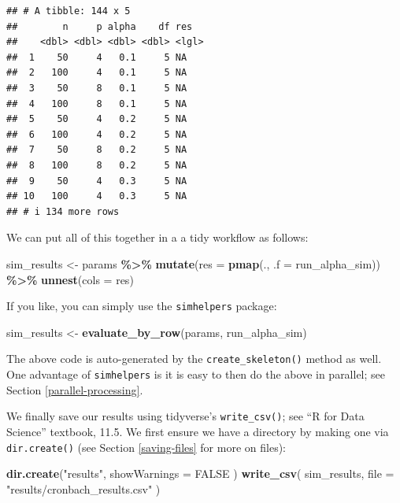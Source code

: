\documentclass[
]{book}
\newenvironment{Shaded}{\begin{snugshade}}{\end{snugshade}}
\newcommand{\AttributeTok}[1]{\textcolor[rgb]{0.13,0.29,0.53}{#1}}
\newcommand{\ConstantTok}[1]{\textcolor[rgb]{0.56,0.35,0.01}{#1}}
\newcommand{\FunctionTok}[1]{\textcolor[rgb]{0.13,0.29,0.53}{\textbf{#1}}}
\newcommand{\NormalTok}[1]{#1}
\newcommand{\OtherTok}[1]{\textcolor[rgb]{0.56,0.35,0.01}{#1}}
\newcommand{\SpecialCharTok}[1]{\textcolor[rgb]{0.81,0.36,0.00}{\textbf{#1}}}
\newcommand{\StringTok}[1]{\textcolor[rgb]{0.31,0.60,0.02}{#1}}
\begin{document}
\begin{verbatim}
## # A tibble: 144 x 5
##        n     p alpha    df res  
##    <dbl> <dbl> <dbl> <dbl> <lgl>
##  1    50     4   0.1     5 NA   
##  2   100     4   0.1     5 NA   
##  3    50     8   0.1     5 NA   
##  4   100     8   0.1     5 NA   
##  5    50     4   0.2     5 NA   
##  6   100     4   0.2     5 NA   
##  7    50     8   0.2     5 NA   
##  8   100     8   0.2     5 NA   
##  9    50     4   0.3     5 NA   
## 10   100     4   0.3     5 NA   
## # i 134 more rows
\end{verbatim}

We can put all of this together in a a tidy workflow as follows:

\begin{Shaded}
\begin{Highlighting}[]
\NormalTok{sim\_results }\OtherTok{\textless{}{-}} 
\NormalTok{  params }\SpecialCharTok{\%\textgreater{}\%}
  \FunctionTok{mutate}\NormalTok{(}\AttributeTok{res =} \FunctionTok{pmap}\NormalTok{(., }\AttributeTok{.f =}\NormalTok{ run\_alpha\_sim)) }\SpecialCharTok{\%\textgreater{}\%}
  \FunctionTok{unnest}\NormalTok{(}\AttributeTok{cols =}\NormalTok{ res)}
\end{Highlighting}
\end{Shaded}

If you like, you can simply use the \texttt{simhelpers} package:

\begin{Shaded}
\begin{Highlighting}[]
\NormalTok{sim\_results }\OtherTok{\textless{}{-}} \FunctionTok{evaluate\_by\_row}\NormalTok{(params, run\_alpha\_sim)}
\end{Highlighting}
\end{Shaded}

The above code is auto-generated by the \texttt{create\_skeleton()} method as well.
One advantage of \texttt{simhelpers} is it is easy to then do the above in parallel; see Section \ref{parallel-processing}.

We finally save our results using tidyverse's \texttt{write\_csv()}; see ``R for Data Science'' textbook, 11.5.
We first ensure we have a directory by making one via \texttt{dir.create()} (see Section \ref{saving-files} for more on files):

\begin{Shaded}
\begin{Highlighting}[]
\FunctionTok{dir.create}\NormalTok{(}\StringTok{"results"}\NormalTok{, }\AttributeTok{showWarnings =} \ConstantTok{FALSE}\NormalTok{ )}
\FunctionTok{write\_csv}\NormalTok{( sim\_results, }\AttributeTok{file =} \StringTok{"results/cronbach\_results.csv"}\NormalTok{ )}
\end{Highlighting}
\end{Shaded}
\end{document}
